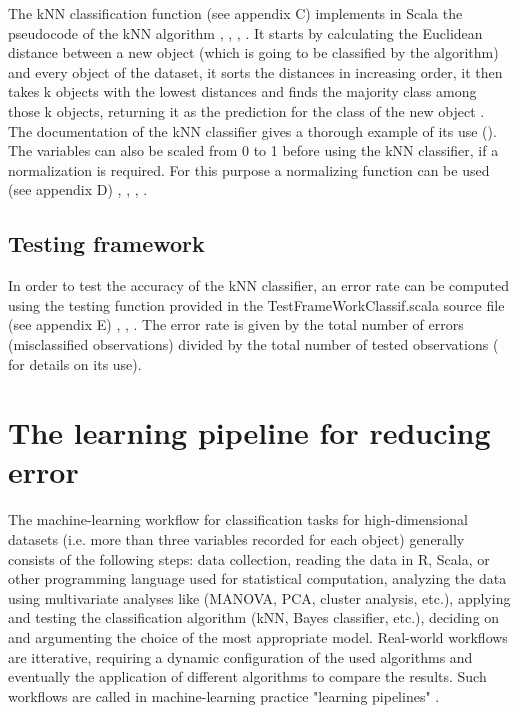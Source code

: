 \documentclass[twoside, 11 p]{article}
\begin{document}
The kNN classification function (see appendix C) implements in Scala the pseudocode of the kNN algorithm \citep{harrington_machine_2012}, \citep{odersky_programming_2010}, \citep{swartz_learning_2015}, \citep{noauthor_scala_2003}. 
It starts by calculating the Euclidean distance between a new object (which is going to be classified by the algorithm) and every object of the dataset, it sorts the distances in increasing order, it then takes k objects with the lowest distances and finds the majority class among those k objects, returning it as the prediction for the class of the new object \citep{harrington_machine_2012}.
The documentation of the kNN classifier gives a thorough example of its use (\citep[see]{tesileanu_introduction_2017}). 
The variables can also be scaled from 0 to 1 before using the kNN classifier, if a normalization is required. For this purpose a normalizing function can be used (see appendix D) \cite{quinn_experimental_2002}, \cite{harrington_machine_2012}, \cite{odersky_programming_2010}, \cite{noauthor_scala_2003}. 

\subsection{Testing framework}    

In order to test the accuracy of the kNN classifier, an error rate can be computed using the testing function provided in the TestFrameWorkClassif.scala source file (see appendix E) \citep{harrington_machine_2012}, \citep{odersky_programming_2010}, \citep{noauthor_scala_2003}.
 The error rate is given by the total number of errors (misclassified observations) divided by the total number of tested observations (\cite[see]{tesileanu_introduction_2017} for details on its use). 

\section{The learning pipeline for reducing error}

The machine-learning workflow for classification tasks for high-dimensional datasets (i.e. more than three variables recorded for each object) generally consists of the following steps: data collection, reading the data in R, Scala, or other programming language used for statistical computation, analyzing the data using multivariate analyses like (MANOVA, PCA, cluster analysis, etc.), applying and testing the classification algorithm (kNN, Bayes classifier, etc.), deciding on and argumenting the choice of the most appropriate model. 
 Real-world workflows are itterative, requiring a dynamic configuration of the used algorithms and eventually the application of different algorithms to compare the results.
 Such workflows are called in machine-learning practice "learning pipelines" \citep{karau_learning_2015}.\\
\end{document}
